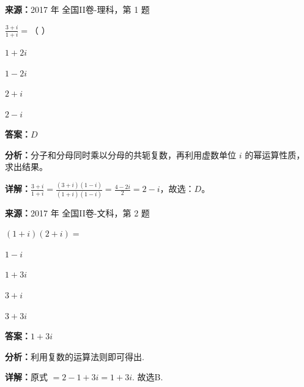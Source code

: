 \begin{question}[points=5]
\textbf{来源：}2017 年 全国II卷-理科，第 1 题\par
$\frac{3+i}{1+i}=$（   ）
\begin{choices}
  \item $1+2i$
  \item $1-2i$
  \item $2+i$
  \item $2-i$
\end{choices}
\begin{solution}
\textbf{答案：}$D$

\textbf{分析：}分子和分母同时乘以分母的共轭复数，再利用虚数单位 $i$ 的幂运算性质，求出结果。

\textbf{详解：}$\frac{3+i}{1+i}=\frac{(3+i)(1-i)}{(1+i)(1-i)}=\frac{4-2i}{2}=2-i$，故选：$D$。
\end{solution}
\end{question}

\begin{question}[points=5]
\textbf{来源：}2017 年 全国II卷-文科，第 2 题\par
$(1+i)(2+i)=$
\begin{choices}
  \item $1-i$
  \item $1+3i$
  \item $3+i$
  \item $3+3i$
\end{choices}
\begin{solution}
\textbf{答案：}$1+3i$

\textbf{分析：}利用复数的运算法则即可得出.

\textbf{详解：}原式 $=2-1+3i=1+3i$. 故选B.
\end{solution}
\end{question}

